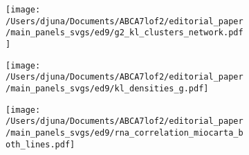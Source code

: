 \documentclass[12pt]{article}
\begin{document}
\begin{figure}[H]
    \begin{subfigure}[t]{.3\textwidth}
        \caption{}
        \texttt{[image: /Users/djuna/Documents/ABCA7lof2/editorial\_paper/main\_panels\_svgs/ed9/g2\_kl\_clusters\_network.pdf]}        
    \end{subfigure}
    \begin{subfigure}[t]{.6\textwidth}
        \caption{}
        \texttt{[image: /Users/djuna/Documents/ABCA7lof2/editorial\_paper/main\_panels\_svgs/ed9/kl\_densities\_g.pdf]}        
    \end{subfigure}
    \hspace{0.5cm}
    \begin{subfigure}[t]{.3\textwidth}
        \caption{}
        \texttt{[image: /Users/djuna/Documents/ABCA7lof2/editorial\_paper/main\_panels\_svgs/ed9/rna\_correlation\_miocarta\_both\_lines.pdf]}        
    \end{subfigure}
\end{figure}
\end{document}
